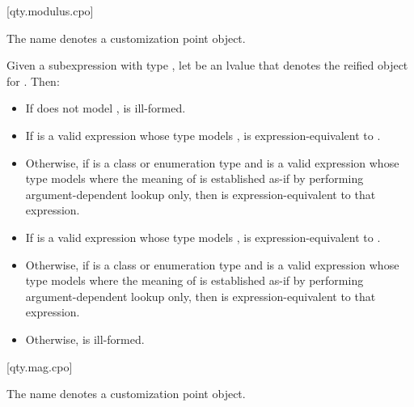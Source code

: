 [qty.modulus.cpo]{}

\pnum
The name  denotes a customization point object.

\pnum
Given a subexpression  with type ,
let  be an lvalue that denotes the reified object for .
Then:
\begin{itemize}
\item
If  does not model ,
 is ill-formed.
\item
If  is a valid expression whose type models ,
 is expression-equivalent to .
\item
Otherwise, if  is a class or enumeration type and
 is a valid expression whose type models 
where the meaning of  is established as-if by performing argument-dependent lookup only,
then  is expression-equivalent to that expression.
\item
If  is a valid expression whose type models ,
 is expres\-sion-equivalent to .
\item
Otherwise, if  is a class or enumeration type and
 is a valid expression whose type models 
where the meaning of  is established as-if by performing argument-dependent lookup only,
then  is expression-equivalent to that expression.
\item
Otherwise,  is ill-formed.
\end{itemize}

[qty.mag.cpo]{}

\pnum
The name  denotes a customization point object.

